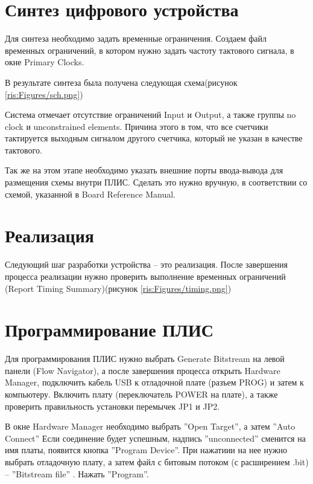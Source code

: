 \begin{sloppypar}
\section{Синтез цифрового устройства} %
Для синтеза необходимо задать временные ограничения. Создаем файл временных ограничений, в котором нужно задать частоту тактового сигнала, в окне Primary Clocks. 

В результате синтеза была получена следующая схема(рисунок \ref{ris:Figures/sch.png})
\begin{landscape}
\end{landscape}

\newpage
Система отмечает отсутствие ограничений Input и Output, а также группы no clock и unconstrained elements. Причина этого в том, что все счетчики тактируется выходным сигналом другого счетчика, который не указан в качестве тактового.

Так же на этом этапе необходимо указать внешние порты ввода-вывода для размещения схемы внутри ПЛИС. Сделать это нужно вручную, в соответствии со схемой, указанной в Board Reference Manual.




\section{Реализация} %
Следующий шаг разработки устройства – это реализация.
После завершения процесса реализации нужно проверить выполнение временных ограничений (Report Timing Summary)(рисунок \ref{ris:Figures/timing.png})
\section{Программирование ПЛИС} %

Для программирования ПЛИС нужно выбрать Generate Bitstream на левой панели (Flow Navigator), а после завершения процесса открыть Hardware Manager, подключить кабель USB к отладочной плате (разъем PROG) и затем к компьютеру. Включить плату (переключатель POWER на плате), а также проверить правильность установки перемычек JP1 и JP2. 

В окне Hardware Manager необходимо выбрать ''Open Target'', а затем ''Auto Connect'' Если соединение будет успешным, надпись ''unconnected'' сменится на имя платы, появится кнопка ''Program Device''. При нажатиии на нее нужно выбрать отладочную плату, а затем файл с битовым потоком (с расширением
.bit) -- ''Bitstream file'' . Нажать ''Program''.


\end{sloppypar}
